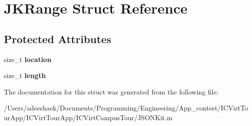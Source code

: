 \hypertarget{struct_j_k_range}{\section{J\-K\-Range Struct Reference}
\label{struct_j_k_range}
}
\subsection*{Protected Attributes}
\begin{DoxyCompactItemize}
\item 
\hypertarget{struct_j_k_range_aee35c31c78c5dc53de288fe56b229ce2}{size\-\_\-t {\bfseries location}}\label{struct_j_k_range_aee35c31c78c5dc53de288fe56b229ce2}

\item 
\hypertarget{struct_j_k_range_ae809d5359ac030c60a30a8f0b2294b82}{size\-\_\-t {\bfseries length}}\label{struct_j_k_range_ae809d5359ac030c60a30a8f0b2294b82}

\end{DoxyCompactItemize}


The documentation for this struct was generated from the following file\-:\begin{DoxyCompactItemize}
\item 
/\-Users/adeeshaek/\-Documents/\-Programming/\-Engineering/\-App\-\_\-contest/\-I\-C\-Virt\-Tour\-App/\-I\-C\-Virt\-Tour\-App/\-I\-C\-Virt\-Campus\-Tour/J\-S\-O\-N\-Kit.\-m\end{DoxyCompactItemize}
